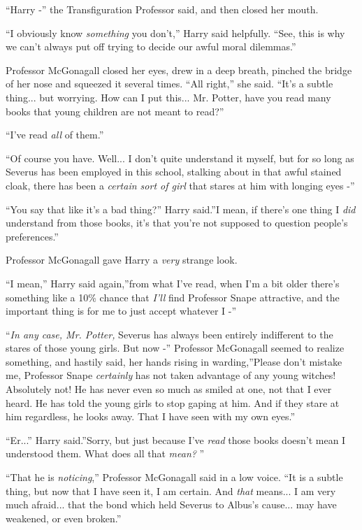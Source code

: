 ``Harry -'' the Transfiguration Professor said, and then closed her
mouth.

``I obviously know \emph{something} you don't,'' Harry said helpfully.
``See, this is why we can't always put off trying to decide our awful
moral dilemmas.''

Professor McGonagall closed her eyes, drew in a deep breath, pinched the
bridge of her nose and squeezed it several times. ``All right,'' she
said. ``It's a subtle thing... but worrying. How can I put
this... Mr. Potter, have you read many books that young children
are not meant to read?''

``I've read \emph{all} of them.''

``Of course you have. Well... I don't quite understand it myself,
but for so long as Severus has been employed in this school, stalking
about in that awful stained cloak, there has been a \emph{certain sort
of girl} that stares at him with longing eyes -''

``You say that like it's a bad thing?'' Harry said.''I mean, if there's
one thing I \emph{did} understand from those books, it's that you're not
supposed to question people's preferences.''

Professor McGonagall gave Harry a \emph{very} strange look.

``I mean,'' Harry said again,''from what I've read, when I'm a bit older
there's something like a 10\% chance that \emph{I'll} find Professor
Snape attractive, and the important thing is for me to just accept
whatever I -''

``\emph{In any case, Mr. Potter,} Severus has always been entirely
indifferent to the stares of those young girls. But now -'' Professor
McGonagall seemed to realize something, and hastily said, her hands
rising in warding,''Please don't mistake me, Professor Snape
\emph{certainly} has not taken advantage of any young witches!
Absolutely not! He has never even so much as smiled at one, not that I
ever heard. He has told the young girls to stop gaping at him. And if
they stare at him regardless, he looks away. That I have seen with my
own eyes.''

``Er...'' Harry said.''Sorry, but just because I've \emph{read}
those books doesn't mean I understood them. What does all that
\emph{mean?} ''

``That he is \emph{noticing},'' Professor McGonagall said in a low voice.
``It is a subtle thing, but now that I have seen it, I am certain. And
\emph{that} means... I am very much afraid... that the bond
which held Severus to Albus's cause... may have weakened, or even
broken.''

